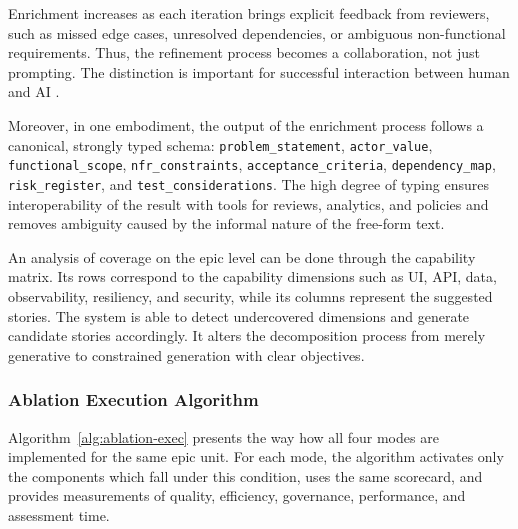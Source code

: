\documentclass[pdflatex,sn-basic]{sn-jnl}
\begin{document}
Enrichment increases as each iteration brings explicit feedback from reviewers, such as missed edge cases, unresolved dependencies, or ambiguous non-functional requirements. Thus, the refinement process becomes a collaboration, not just prompting. The distinction is important for successful interaction between human and AI \citep{R56,R57}.

Moreover, in one embodiment, the output of the enrichment process follows a canonical, strongly typed schema:\linebreak
\texttt{problem\_statement}, \texttt{actor\_value}, \texttt{functional\_scope}, \texttt{nfr\_constraints}, \texttt{acceptance\_criteria},\linebreak
\texttt{dependency\_map}, \texttt{risk\_register}, and \texttt{test\_considerations}. The high degree of typing ensures interoperability of the result with tools for reviews, analytics, and policies and removes ambiguity caused by the informal nature of the free-form text.

An analysis of coverage on the epic level can be done through the capability matrix. Its rows correspond to the capability dimensions such as UI, API, data, observability, resiliency, and security, while its columns represent the suggested stories. The system is able to detect undercovered dimensions and generate candidate stories accordingly. It alters the decomposition process from merely generative to constrained generation with clear objectives.

\subsubsection{Ablation Execution Algorithm}
Algorithm~\ref{alg:ablation-exec} presents the way how all four modes are implemented for the same epic unit. For each mode, the algorithm activates only the components which fall under this condition, uses the same scorecard, and provides measurements of quality, efficiency, governance, performance, and assessment time.
\end{document}
